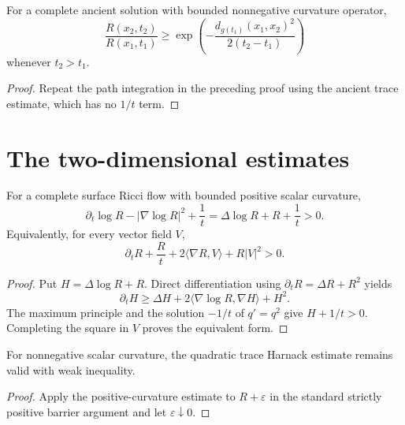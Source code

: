 \begin{corollary}
\label{cor:chow-ii-ancient-scalar-curvature-spacetime-comparison}
For a complete ancient solution with bounded nonnegative curvature operator,
\[
\frac{R(x_2,t_2)}{R(x_1,t_1)}\ge
\exp\!\left(-\frac{d_{g(t_1)}(x_1,x_2)^2}{2(t_2-t_1)}\right)
\]
whenever \(t_2>t_1\).
\end{corollary}
\begin{proof}
Repeat the path integration in the preceding proof using the ancient trace
estimate, which has no \(1/t\) term.
\end{proof}

\section{The two-dimensional estimates}

\begin{proposition}
\label{prop:chow-ii-surface-trace-harnack-positive-curvature}
For a complete surface Ricci flow with bounded positive scalar curvature,
\[
\partial_t\log R-|\nabla\log R|^2+\frac1t
=\Delta\log R+R+\frac1t>0.
\]
Equivalently, for every vector field \(V\),
\[
\partial_tR+\frac Rt+2\langle\nabla R,V\rangle+R|V|^2>0.
\]
\end{proposition}
\begin{proof}
Put \(H=\Delta\log R+R\).  Direct differentiation using
\(\partial_tR=\Delta R+R^2\) yields
\[
\partial_tH\ge\Delta H+2\langle\nabla\log R,\nabla H\rangle+H^2.
\]
The maximum principle and the solution \(-1/t\) of \(q'=q^2\) give
\(H+1/t>0\).  Completing the square in \(V\) proves the equivalent form.
\end{proof}

\begin{remark}
\label{rem:chow-ii-surface-trace-harnack-nonnegative-curvature}
For nonnegative scalar curvature, the quadratic trace Harnack estimate remains
valid with weak inequality.
\end{remark}
\begin{proof}
Apply the positive-curvature estimate to \(R+\varepsilon\) in the standard
strictly positive barrier argument and let \(\varepsilon\downarrow0\).
\end{proof}

